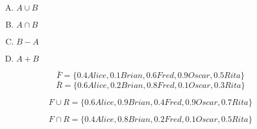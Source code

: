 {{        %
        \begin{practices}
            \begin{enumerate}[A.]
                \item $A \cup B$
                \item $A \cap B$
                \item $B - A$
                \item $A + B$
            \end{enumerate}
        \end{practices}

        \begin{practices}
            $$\bar{F} = \{0.4 Alice, 0.1 Brian, 0.6 Fred, 0.9 Oscar, 0.5 Rita\}$$
            $$\bar{R} = \{0.6 Alice, 0.2 Brian, 0.8 Fred, 0.1 Oscar, 0.3 Rita\}$$
        \end{practices}

        \begin{practices}
            $$F \cup R = \{0.6 Alice, 0.9 Brian, 0.4 Fred, 0.9 Oscar, 0.7 Rita\}$$
        \end{practices}

        \begin{practices}
            $$F \cap R = \{0.4 Alice, 0.8 Brian, 0.2 Fred, 0.1 Oscar, 0.5 Rita\}$$
        \end{practices}
    }
}
